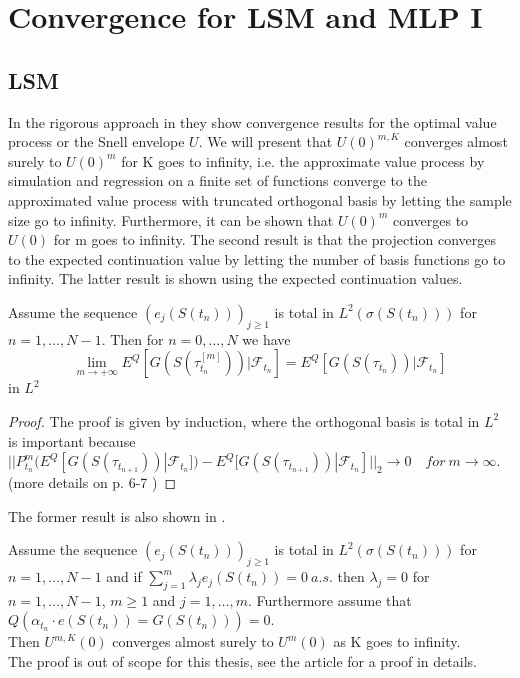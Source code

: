 \section{Convergence for LSM and MLP I}\label{Convergence}
\subsection{LSM}
In the rigorous approach in \parencite{analysisLSM} they show convergence results for the optimal value process or the Snell envelope $U$. We will present that $U(0)^{m,K}$ converges almost surely to $U(0)^{m}$ for K goes to infinity, i.e. the approximate value process by simulation and regression on a finite set of functions converge to the approximated value process with truncated orthogonal basis by letting the sample size go to infinity. Furthermore, it can be shown that $U(0)^{m}$ converges to $U(0)$ for m goes to infinity. The second result is that the projection converges to the expected continuation value by letting the number of basis functions go to infinity. The latter result is shown using the expected continuation values.
\begin{theorem}\label{LSMConvergence1}
Assume the sequence $(e_{j}(S(t_n)))_{j\geq 1}$ is total in $L^2(\sigma(S(t_n)))$ for $n=1,\ldots,N-1$. Then for $n=0,\ldots,N$ we have
$$\lim_{m\to +\infty} E^Q[G(S(\tau_{t_n}^{[m]})) |\mathcal{F}_{t_n}]=E^Q[G(S(\tau_{t_n})) |\mathcal{F}_{t_n}]$$
in $L^2$
\begin{proof}
The proof is given by induction, where the orthogonal basis is total in $L^2$ is important because $||P^m_{t_n}(E^Q[G(S(\tau_{t_{n+1}}))|\mathcal{F}_{t_n}])- E^Q[G(S(\tau_{t_{n+1}}))|\mathcal{F}_{t_n}]||_2 \to 0 \quad for \ m \to \infty$.
(more details on p. 6-7 \parencite{analysisLSM})
\end{proof}
\end{theorem}

The former result is also shown in \parencite{analysisLSM}.
\begin{theorem}\label{LSMConvergence2}
Assume the sequence $(e_{j}(S(t_n)))_{j\geq 1}$ is total in $L^2(\sigma(S(t_n)))$ for $n=1,\ldots,N-1$ and if $\sum_{j=1}^{m} \lambda_j e_{j}(S(t_n))=0 \ a.s.$ then $\lambda_j=0$ for $n=1,\ldots,N-1$, $m\geq 1$ and $j=1,\ldots,m$. Furthermore assume that $Q(\alpha_{t_n} \cdot e(S(t_n))=G(S(t_n)))=0$.\\
Then $U^{m,K}(0)$ converges almost surely to $U^{m}(0)$ as K goes to infinity.\\
The proof is out of scope for this thesis, see the article \parencite{analysisLSM} for a proof in details. 
\end{theorem}

